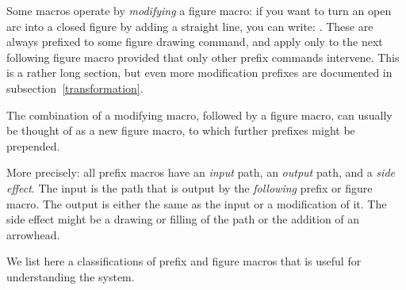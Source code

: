 \documentclass[letterpaper]{article}
\begin{document}
Some \mfp{} macros operate by \emph{modifying} a figure macro: if you
want to turn an open arc into a closed figure by adding a straight line,
you can write: . These are
always prefixed to some figure drawing command, and apply only to the
next following figure macro provided that only other prefix commands
intervene. This is a rather long section, but even more modification
prefixes are documented in subsection~\ref{transformation}.

The combination of a modifying macro, followed by a figure macro, can
usually be thought of as a new figure macro, to which further prefixes
might be prepended.

More precisely: all prefix macros have an \emph{input} path, an
\emph{output} path, and a \emph{side effect}. The input is the path that
is output by the \emph{following} prefix or figure macro. The output is
either the same as the input or a modification of it. The side effect
might be a drawing or filling of the path or the addition of an
arrowhead.

We list here a classifications of prefix and figure macros that is
useful for understanding the \mfp{} system.
\end{document}
